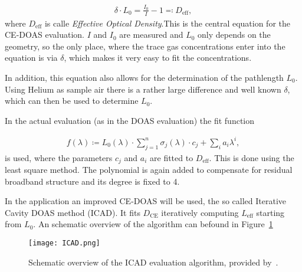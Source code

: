 \begin{align}
  \delta \cdot L_0 = \frac{I_0}{I} - 1 \eqqcolon D_{\text{eff}}, \label{eq:ce-central}
\end{align}
where $D_{\text{eff}}$ is calle \emph{Effective Optical Density}.This
is the central equation for the CE-DOAS evaluation. $I$ and $I_0$ are
measured and $L_0$ only depends on the geometry, so the only place, where
the trace gas concentrations enter into the equation is via $\delta$, which makes
it very easy to fit the concentrations.

In addition, this equation also allows for the determination of the
pathlength $L_0$. Using Helium as sample air there is a rather large
difference and well known $\delta$, which can then be used to determine
$L_0$.

In the actual evaluation (as in the DOAS evaluation) the fit function

\begin{align*}
  f(\lambda) \coloneqq L_0(\lambda)\cdot\sum_{j=1}^n \sigma_j(\lambda)
  \cdot c_j + \sum_i a_i \lambda^i,
\end{align*}
is used, where the parameters $c_j$ and $a_i$ are fitted to
$D_{\text{eff}}$. This is done using the least square method. The
polynomial is again added to compensate for residual broadband
structure and its degree is fixed to \num{4}.

In the application an improved CE-DOAS will be used, the so called
Iterative Cavity DOAS method (ICAD). It fits $D_{\text{CE}}$
iteratively computing $L_{\text{eff}}$ starting from $L_0$. An
schematic overview of the algorithm can befound in Figure~\ref{fig:icad}

\begin{figure}[htbp]
  \centering
  \texttt{[image: ICAD.png]}
  \caption{Schematic overview of the ICAD evaluation algorithm,
    provided by~\cite{martin}.}
  \label{fig:icad}
\end{figure}

